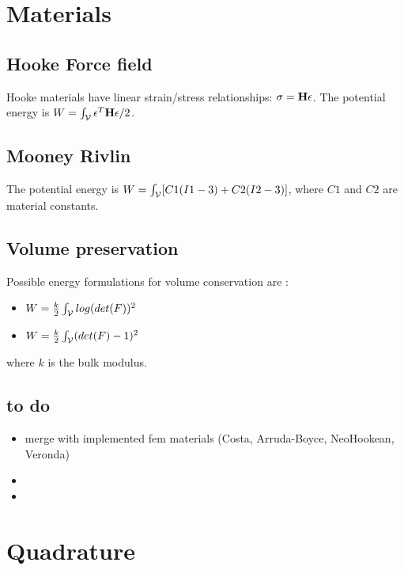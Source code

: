 \newpage
\section{Materials}

\subsection{Hooke Force field}

Hooke materials have linear strain/stress relationships: $\sigma=\mathbf{{H}}\epsilon$. 
The potential energy is $W= \int_{\mathcal{V}} \epsilon^T\mathbf{{H}}\epsilon /2$. 

\subsection{Mooney Rivlin}

The potential energy is $W= \int_{\mathcal{V}} [ C1 ( I1 - 3)  + C2 ( I2 - 3) ]$, where $C1$ and $C2$ are material constants.

\subsection{Volume preservation}

Possible energy formulations for volume conservation are :
\begin{itemize}
 \item $W= \frac{k}{2} \int_{\mathcal{V}} log( det(F) )^2$
 \item $W= \frac{k}{2} \int_{\mathcal{V}} (det(F)-1)^2$
\end{itemize}
where $k$ is the bulk modulus.

\subsection{to do}

\begin{itemize}
 \item merge with implemented fem materials (Costa, Arruda-Boyce, NeoHookean, Veronda)
 \item 
 \item 
\end{itemize}

\newpage
\section{Quadrature}

